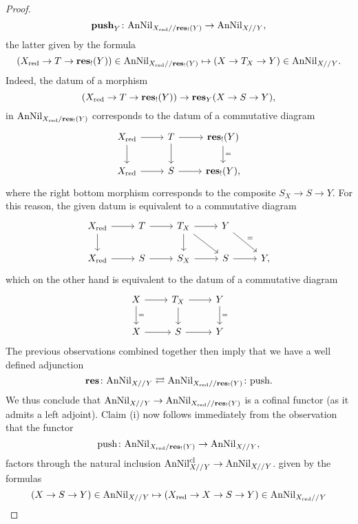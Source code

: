 \documentclass[10pt,a4paper,reqno]{amsart} %
\theoremstyle{plain}
\theoremstyle{definition}
\theoremstyle{remark}
\numberwithin{equation}{section}
\begin{document}
\begin{proof}
        \[
            \mathbf{push}_Y \colon \mathrm{AnNil}_{X_{\mathrm{red}} // \mathbf{res}_!(Y)} \to \mathrm{AnNil}_{X//Y},  
        \]
    the latter given by the formula
        \[
            (X_{\mathrm{red}} \to T \to \mathbf{res}_!(Y)) \in \mathrm{AnNil}_{X_{\mathrm{red}} // \mathbf{res}_!(Y)} \mapsto (X \to T_X \to Y)  \in \mathrm{AnNil}_{X//Y}.
        \]
    Indeed, the datum of a morphism
        \[
            (X_{\mathrm{red}} \to T \to \mathbf{res}_!(Y)) \to \mathbf{res}_Y(X \to S \to Y),  
        \]
    in $\mathrm{AnNil}_{X_{\mathrm{red}} / \mathbf{res}_!(Y)}$ corresponds to the datum of a commutative diagram
        \[
        \begin{tikzcd}
          X_\red \ar{r} \ar{d} & T \ar{r} \ar{d} & \mathbf{res}_!(Y) \ar{d}{=} \\
          X_\red \ar{r} & S \ar{r} & \mathbf{res}_!(Y),  
        \end{tikzcd}
        \]
    where the right bottom morphism corresponds to the composite $S_X \to S \to Y$. For this reason, the given datum is equivalent to a commutative diagram
        \[
        \begin{tikzcd}
            X_\red \ar{r} \ar{d} & T \ar{r} &  T_X \ar{r} \ar{rd} \ar{d}  & Y \ar{rd}{=} \\
            X_\red \ar{r} & S \ar{r} &  S_X \ar{r} & S \ar{r} & Y,
        \end{tikzcd}
        \]
    which on the other hand is equivalent to the datum of a commutative diagram
        \[
        \begin{tikzcd}
            X \ar{r} \ar{d}{=} & T_X \ar{r} \ar{d} & Y \ar{d}{=} \\
            X \ar{r} & S \ar{r} & Y
        \end{tikzcd}
        \]
    The previous observations combined together then imply that we have a well defined adjunction
        \[
            \mathbf{res} \colon \mathrm{AnNil}_{X/ /Y} \rightleftarrows \mathrm{AnNil}_{X_{\mathrm{red}} // \mathbf{res}_!(Y)} \colon \mathrm{push}.
        \]
    We thus conclude that $\mathrm{AnNil}_{X//Y} \to \mathrm{AnNil}_{X_{\mathrm{red}} // \mathbf{res}_!(Y)}$ is a cofinal functor (as it admits a left adjoint). Claim (i) now follows
    immediately from the observation that the functor
        \[
            \mathrm{push} \colon \mathrm{AnNil}_{X_{\mathrm{red}} / \mathbf{res}_!(Y)} \to \mathrm{AnNil}_{X//Y},  
        \]
    factors through the natural inclusion $\mathrm{AnNil}_{X//Y}^{\mathrm{cl}} \to \mathrm{AnNil}_{X//Y}$.
    given by the formulas
        \[
            (X \to S \to Y) \in \mathrm{AnNil}_{X//Y} \mapsto (X_{\mathrm{red}} \to X \to S \to Y) \in \mathrm{AnNil}_{X_{\mathrm{red}}// Y}
        \]
    

\end{proof}
\end{document}
